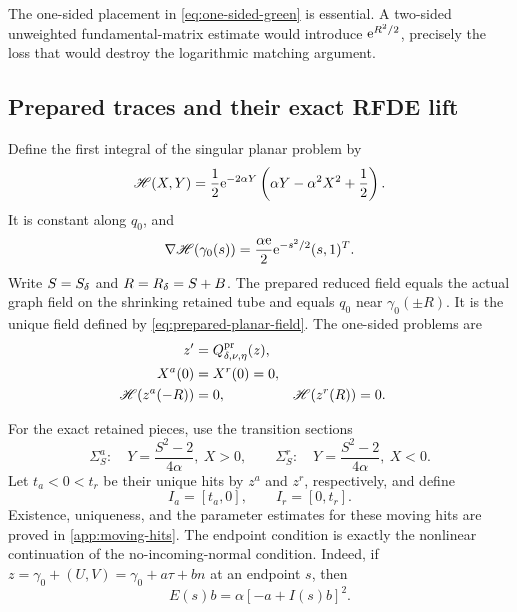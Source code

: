 The one-sided placement in \cref{eq:one-sided-green} is essential.  A
two-sided unweighted fundamental-matrix estimate would introduce
\(\mathrm e^{R^2/2}\), precisely the loss that would destroy the logarithmic
matching argument.

\subsection{Prepared traces and their exact RFDE lift}

Define the first integral of the singular planar problem by
\begin{equation}
\label{eq:first-integral}
 \mathscr H(X,Y)=\frac12\mathrm e^{-2\alpha Y}
 \left(\alpha Y-\alpha^2X^2+\frac12\right).
\end{equation}
It is constant along \(q_0\), and
\begin{equation}
\label{eq:first-integral-gradient}
 \nabla\mathscr H(\gamma_0(s))
 =\frac{\alpha\mathrm e}{2}\mathrm e^{-s^2/2}(s,1)^T.
\end{equation}
Write \(S=S_\delta\) and \(R=R_\delta=S+B\).  The prepared reduced field equals the actual graph
field on the shrinking retained tube and equals \(q_0\) near
\(\gamma_0(\pm R)\).  It is the unique field defined by
\cref{eq:prepared-planar-field}.  The one-sided problems are
\begin{equation}
\label{eq:trace-bvp}
\begin{aligned}
 z'&=Q^{\rm pr}_{\delta,\nu,\eta}(z),\\
 X^a(0)&=X^r(0)=0,\\
 \mathscr H(z^a(-R))&=0,
 &\mathscr H(z^r(R))&=0.
\end{aligned}
\end{equation}

For the exact retained pieces, use the transition sections
\begin{equation}
\label{eq:transition-sections}
 \Sigma_S^a:\quad
 Y=\frac{S^2-2}{4\alpha},\ X>0,
 \qquad
 \Sigma_S^r:\quad
 Y=\frac{S^2-2}{4\alpha},\ X<0.
\end{equation}
Let \(t_a<0<t_r\) be their unique hits by \(z^a\) and \(z^r\),
respectively, and define
\begin{equation}
\label{eq:retained-intervals}
 I_a=[t_a,0],\qquad I_r=[0,t_r].
\end{equation}
Existence, uniqueness, and the parameter estimates for these moving hits
are proved in \cref{app:moving-hits}.
The endpoint condition is exactly the nonlinear continuation of the
no-incoming-normal condition.  Indeed, if
\(z=\gamma_0+(U,V)=\gamma_0+a\tau+bn\) at an endpoint \(s\), then
\begin{equation}
\label{eq:nonlinear-boundary}
 E(s)b=\alpha[-a+I(s)b]^2.
\end{equation}


